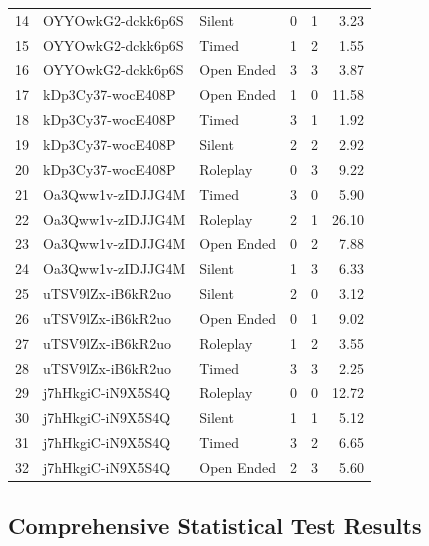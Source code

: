 \begin{longtable}{clllrr}
14 & OYYOwkG2-dckk6p6S & Silent & 0 & 1 & 3.23 \\
15 & OYYOwkG2-dckk6p6S & Timed & 1 & 2 & 1.55 \\
16 & OYYOwkG2-dckk6p6S & Open Ended & 3 & 3 & 3.87 \\
17 & kDp3Cy37-wocE408P & Open Ended & 1 & 0 & 11.58 \\
18 & kDp3Cy37-wocE408P & Timed & 3 & 1 & 1.92 \\
19 & kDp3Cy37-wocE408P & Silent & 2 & 2 & 2.92 \\
20 & kDp3Cy37-wocE408P & Roleplay & 0 & 3 & 9.22 \\
21 & Oa3Qww1v-zIDJJG4M & Timed & 3 & 0 & 5.90 \\
22 & Oa3Qww1v-zIDJJG4M & Roleplay & 2 & 1 & 26.10 \\
23 & Oa3Qww1v-zIDJJG4M & Open Ended & 0 & 2 & 7.88 \\
24 & Oa3Qww1v-zIDJJG4M & Silent & 1 & 3 & 6.33 \\
25 & uTSV9lZx-iB6kR2uo & Silent & 2 & 0 & 3.12 \\
26 & uTSV9lZx-iB6kR2uo & Open Ended & 0 & 1 & 9.02 \\
27 & uTSV9lZx-iB6kR2uo & Roleplay & 1 & 2 & 3.55 \\
28 & uTSV9lZx-iB6kR2uo & Timed & 3 & 3 & 2.25 \\
29 & j7hHkgiC-iN9X5S4Q & Roleplay & 0 & 0 & 12.72 \\
30 & j7hHkgiC-iN9X5S4Q & Silent & 1 & 1 & 5.12 \\
31 & j7hHkgiC-iN9X5S4Q & Timed & 3 & 2 & 6.65 \\
32 & j7hHkgiC-iN9X5S4Q & Open Ended & 2 & 3 & 5.60 \\
\end{longtable}

\subsection{Comprehensive Statistical Test Results}
\label{appendix:performance_data}

